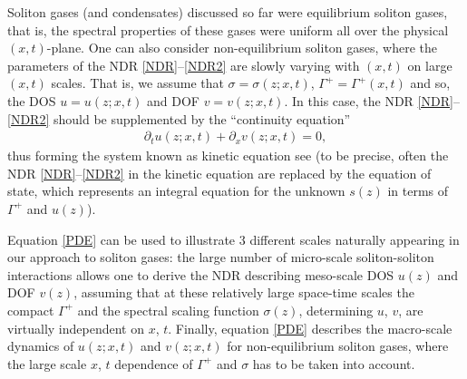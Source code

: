 \documentclass[pdftex]{sigma}
\numberwithin{equation}{section}
\newcommand{\G}{\Gamma}
\def\s{ {\sigma}}
\def\s{\sigma}
\def\G{\Gamma}
\begin{document}
Soliton gases (and condensates) discussed so far were equilibrium soliton gases, that is, the spectral properties of these gases were uniform all over the physical $ (x,t)$-plane. One can also consider non-equilibrium soliton gases, where the parameters of the NDR \eqref{NDR}--\eqref{NDR2} are slowly varying with $ (x,t)$ on large $ (x,t)$ scales. That is, we assume that $\s=\s(z;x,t)$, $\G^+=\G^+(x,t)$ and so, the DOS $u=u(z;x,t)$ and DOF $v=v(z;x,t)$. In this case, the NDR \eqref{NDR}--\eqref{NDR2} should be supplemented by the ``continuity equation''
\begin{gather}\label{PDE}
\partial_t u(z;x,t)+\partial_x v(z;x,t)=0,
\end{gather}
thus forming the system known as kinetic equation see \cite{ET2020} (to be precise, often the NDR \eqref{NDR}--\eqref{NDR2} in the kinetic equation are replaced by the equation of state, which represents an integral equation for the unknown $s(z)$ in terms of $\G^+$ and $u(z)$).

Equation \eqref{PDE} can be used to illustrate 3 different scales naturally appearing in our approach to soliton gases: the large number of micro-scale soliton-soliton interactions allows one to derive the NDR describing meso-scale DOS $u(z)$ and DOF $v(z)$, assuming that at these relatively large space-time scales the compact $\G^+$ and the spectral scaling function $\s(z)$, determining $u$, $v$, are virtually independent on $x$, $t$. Finally, equation \eqref{PDE} describes the macro-scale dynamics of $u(z;x,t)$ and $v(z;x,t)$ for non-equilibrium soliton gases, where the large scale $x$, $t$ dependence of $\G^+$ and $\s$ has to be taken into account.
\end{document}
